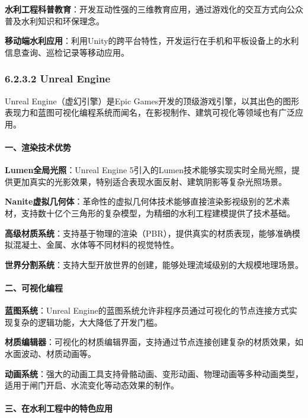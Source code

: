 \textbf{水利工程科普教育}：开发互动性强的三维教育应用，通过游戏化的交互方式向公众普及水利知识和环保理念。

\textbf{移动端水利应用}：利用Unity的跨平台特性，开发运行在手机和平板设备上的水利信息查询、巡检记录等移动应用。

\subsubsection{6.2.3.2 Unreal Engine}\label{unreal-engine}

Unreal Engine（虚幻引擎）是Epic
Games开发的顶级游戏引擎，以其出色的图形表现力和蓝图可视化编程系统而闻名，在影视制作、建筑可视化等领域也有广泛应用。

\paragraph{一、渲染技术优势}\label{ux4e00ux6e32ux67d3ux6280ux672fux4f18ux52bf}

\textbf{Lumen全局光照}：Unreal Engine
5引入的Lumen技术能够实现实时全局光照，提供更加真实的光影效果，特别适合表现水面反射、建筑阴影等复杂光照场景。

\textbf{Nanite虚拟几何体}：革命性的虚拟几何体技术能够直接渲染影视级别的艺术素材，支持数十亿个三角形的复杂模型，为精细的水利工程建模提供了技术基础。

\textbf{高级材质系统}：支持基于物理的渲染（PBR），提供真实的材质表现，能够准确模拟混凝土、金属、水体等不同材料的视觉特性。

\textbf{世界分割系统}：支持大型开放世界的创建，能够处理流域级别的大规模地理场景。

\paragraph{二、可视化编程}\label{ux4e8cux53efux89c6ux5316ux7f16ux7a0b}

\textbf{蓝图系统}：Unreal
Engine的蓝图系统允许非程序员通过可视化的节点连接方式实现复杂的逻辑功能，大大降低了开发门槛。

\textbf{材质编辑器}：可视化的材质编辑界面，支持通过节点连接创建复杂的材质效果，如水面波动、材质动画等。

\textbf{动画系统}：强大的动画工具支持骨骼动画、变形动画、物理动画等多种动画类型，适用于闸门开启、水流变化等动态效果的制作。

\paragraph{三、在水利工程中的特色应用}\label{ux4e09ux5728ux6c34ux5229ux5de5ux7a0bux4e2dux7684ux7279ux8272ux5e94ux7528}


